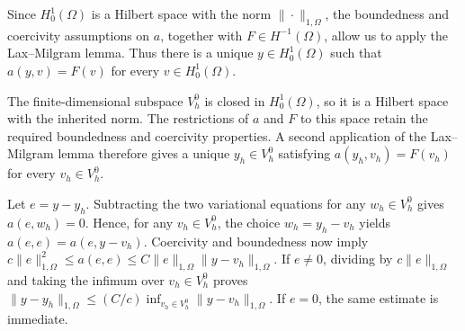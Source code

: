 \documentclass{article}
\begin{document}
Since \(H_0^1(\Omega)\) is a Hilbert space with the norm \(\|\cdot\|_{1,\Omega}\), the boundedness and coercivity assumptions on \(a\), together with \(F\in H^{-1}(\Omega)\), allow us to apply the Lax--Milgram lemma. Thus there is a unique \(y\in H_0^1(\Omega)\) such that \(a(y,v)=F(v)\) for every \(v\in H_0^1(\Omega)\).

The finite-dimensional subspace \(V_h^0\) is closed in \(H_0^1(\Omega)\), so it is a Hilbert space with the inherited norm. The restrictions of \(a\) and \(F\) to this space retain the required boundedness and coercivity properties. A second application of the Lax--Milgram lemma therefore gives a unique \(y_h\in V_h^0\) satisfying \(a(y_h,v_h)=F(v_h)\) for every \(v_h\in V_h^0\).

Let \(e=y-y_h\). Subtracting the two variational equations for any \(w_h\in V_h^0\) gives \(a(e,w_h)=0\). Hence, for any \(v_h\in V_h^0\), the choice \(w_h=y_h-v_h\) yields \(a(e,e)=a(e,y-v_h)\). Coercivity and boundedness now imply \(c\|e\|_{1,\Omega}^2\leq a(e,e)\leq C\|e\|_{1,\Omega}\|y-v_h\|_{1,\Omega}\). If \(e\neq0\), dividing by \(c\|e\|_{1,\Omega}\) and taking the infimum over \(v_h\in V_h^0\) proves \(\|y-y_h\|_{1,\Omega}\leq (C/c)\inf_{v_h\in V_h^0}\|y-v_h\|_{1,\Omega}\). If \(e=0\), the same estimate is immediate.
\end{document}
